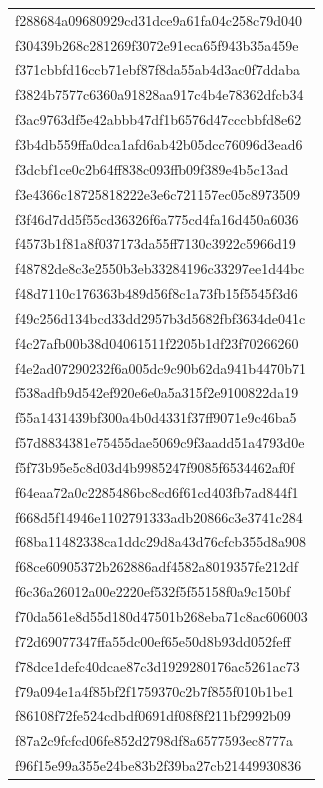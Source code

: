 \begin{tabular}{l}
f288684a09680929cd31dce9a61fa04c258c79d040 \\
f30439b268c281269f3072e91eca65f943b35a459e \\
f371cbbfd16ccb71ebf87f8da55ab4d3ac0f7ddaba \\
f3824b7577c6360a91828aa917c4b4e78362dfcb34 \\
f3ac9763df5e42abbb47df1b6576d47cccbbfd8e62 \\
f3b4db559ffa0dca1afd6ab42b05dcc76096d3ead6 \\
f3dcbf1ce0c2b64ff838c093ffb09f389e4b5c13ad \\
f3e4366c18725818222e3e6c721157ec05c8973509 \\
f3f46d7dd5f55cd36326f6a775cd4fa16d450a6036 \\
f4573b1f81a8f037173da55ff7130c3922c5966d19 \\
f48782de8c3e2550b3eb33284196c33297ee1d44bc \\
f48d7110c176363b489d56f8c1a73fb15f5545f3d6 \\
f49c256d134bcd33dd2957b3d5682fbf3634de041c \\
f4c27afb00b38d04061511f2205b1df23f70266260 \\
f4e2ad07290232f6a005dc9c90b62da941b4470b71 \\
f538adfb9d542ef920e6e0a5a315f2e9100822da19 \\
f55a1431439bf300a4b0d4331f37ff9071e9c46ba5 \\
f57d8834381e75455dae5069c9f3aadd51a4793d0e \\
f5f73b95e5c8d03d4b9985247f9085f6534462af0f \\
f64eaa72a0c2285486bc8cd6f61cd403fb7ad844f1 \\
f668d5f14946e1102791333adb20866c3e3741c284 \\
f68ba11482338ca1ddc29d8a43d76cfcb355d8a908 \\
f68ce60905372b262886adf4582a8019357fe212df \\
f6c36a26012a00e2220ef532f5f55158f0a9c150bf \\
f70da561e8d55d180d47501b268eba71c8ac606003 \\
f72d69077347ffa55dc00ef65e50d8b93dd052feff \\
f78dce1defc40dcae87c3d1929280176ac5261ac73 \\
f79a094e1a4f85bf2f1759370c2b7f855f010b1be1 \\
f86108f72fe524cdbdf0691df08f8f211bf2992b09 \\
f87a2c9fcfcd06fe852d2798df8a6577593ec8777a \\
f96f15e99a355e24be83b2f39ba27cb21449930836 \\

\end{tabular}
